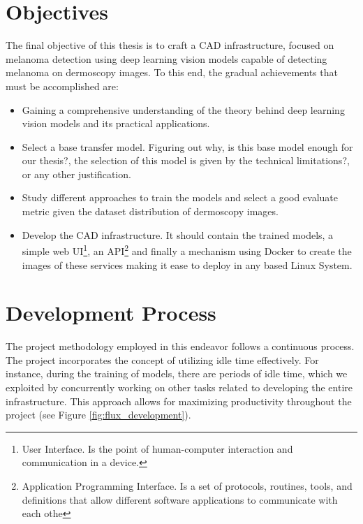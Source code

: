 \newpage

\section{Objectives}

The final objective of this thesis is to craft a CAD infrastructure,
focused on melanoma detection using deep learning vision models capable of detecting melanoma on dermoscopy images. To this end, the gradual achievements that
must be accomplished are:

\begin{itemize}

  \item Gaining a comprehensive understanding of the theory
    behind deep learning vision models and its practical applications.
    
   \item Select a base transfer model. Figuring out why, is this base model enough for our thesis?, the selection of this model is given by the technical limitations?, or any other justification.

  \item Study different approaches to train the models and select a good  evaluate metric given the dataset distribution of dermoscopy images.

  \item  Develop the CAD infrastructure. It should contain
    the  trained models, a simple web UI\footnote{User Interface. Is
    the point of human-computer interaction and communication in a device.}, an
    API\footnote{Application Programming Interface. Is a set of protocols,
      routines, tools, and definitions that allow different software applications
    to communicate with each othe} and finally a mechanism using Docker to create
    the images of these services making it ease to deploy in any based Linux System.

\end{itemize}


\section{Development Process}

The project methodology employed in this endeavor follows a continuous process.
The project incorporates the concept of utilizing idle time effectively. For
instance, during the training of models, there are periods of idle time, which
we exploited by concurrently working on other tasks related to developing the
entire infrastructure. This approach allows for maximizing productivity
throughout the project (see Figure \ref{fig:flux_development}).

